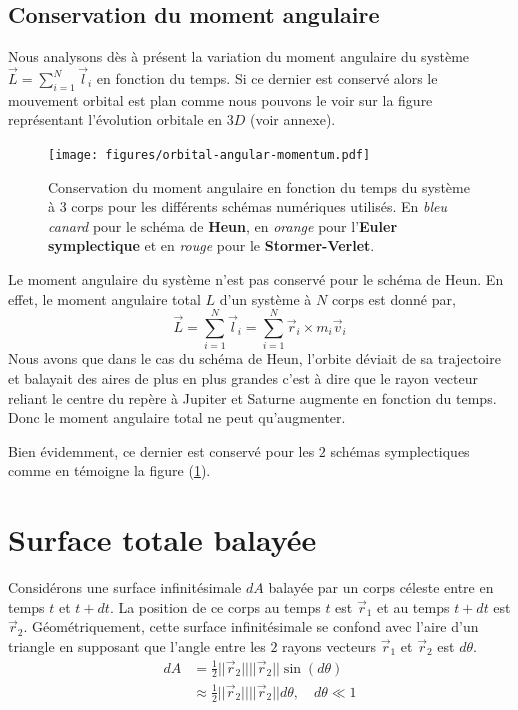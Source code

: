 \documentclass[11pt,twoside=semi,openright,numbers=noenddot]{article}
\begin{document}
\subsection{Conservation du moment angulaire}
Nous analysons dès à présent la variation du moment angulaire du système $\vec{L} = \sum_{i=1}^{N} \vec{l}_i$ en fonction du temps. Si ce dernier est conservé alors le mouvement orbital est plan comme nous pouvons le voir sur la figure représentant l'évolution orbitale en $3D$ (voir annexe).

\begin{figure}[H]
    \centering
    \texttt{[image: figures/orbital-angular-momentum.pdf]}
    \caption{Conservation du moment angulaire en fonction du temps du système à 3 corps pour les différents schémas numériques utilisés. En \emph{bleu canard} pour le schéma de \textbf{Heun}, en \emph{orange} pour l'\textbf{Euler symplectique} et en \emph{rouge} pour le \textbf{Stormer-Verlet}.}
    \label{fig:orbital-angular-momentum}
\end{figure}

Le moment angulaire du système n'est pas conservé pour le schéma de Heun. En effet, le moment angulaire total $L$ d'un système à $N$ corps est donné par,
\begin{equation}
  \vec{L} = \sum_{i=1}^N \vec{l}_i = \sum_{i=1}^N \vec{r}_i \times m_i \vec{v}_i
\end{equation}
Nous avons que dans le cas du schéma de Heun, l'orbite déviait de sa trajectoire et balayait des aires de plus en plus grandes c'est à dire que le rayon vecteur reliant le centre du repère à Jupiter et Saturne augmente en fonction du temps. Donc le moment angulaire total ne peut qu'augmenter.

Bien évidemment, ce dernier est conservé pour les $2$ schémas symplectiques comme en témoigne la figure (\ref{fig:orbital-angular-momentum}).

\section{Surface totale balayée}

Considérons une surface infinitésimale $dA$ balayée par un corps céleste entre en temps $t$ et $t + dt$. La position de ce corps au temps $t$ est $\vec{r}_1$ et au temps $t + dt$ est $\vec{r}_2$. Géométriquement, cette surface infinitésimale se confond avec l'aire d'un triangle en supposant que l'angle entre les $2$ rayons vecteurs $\vec{r}_1$ et $\vec{r}_2$ est $d\theta$.
\begin{align}
  dA
    &= \frac{1}{2} ||\vec{r}_2|| ||\vec{r}_2|| \sin(d\theta) \\
    &\approx \frac{1}{2} ||\vec{r}_2|| ||\vec{r}_2|| d\theta, \quad d\theta \ll 1
\end{align}
\end{document}
